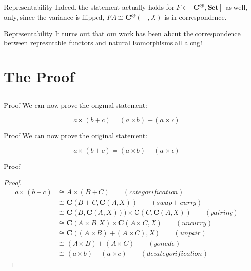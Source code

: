 \documentclass[tikz]{beamer}
\theoremstyle{definition}
\begin{document}
\begin{frame}{Representability}
    Indeed, the statement actually holds for $F \in [\mathbf{C}^{op}, \mathbf{Set}]$ as well, only, since the variance is flipped, $FA \cong \mathbf{C}^{op}(-, X)$ is in correspondence.
\end{frame}{}

\begin{frame}{Representability}
    It turns out that our work has been about the correspondence between represntable functors and natural isomorphisms all along!
\end{frame}{}


\section{The Proof}
\subsection{}
    
\begin{frame}{Proof}
    We can now prove the original statement: 
    
    \begin{block}{}
        \begin{equation*}
            a \times (b + c) = (a \times b) + (a \times c)
        \end{equation*}{}
    \end{block}{}
\end{frame}{}

\begin{frame}{Proof}
    We can now prove the original statement: 
    
    \begin{block}{}
        \begin{equation*}
            a \times (b + c) = (a \times b) + (a \times c)
        \end{equation*}{}
    \end{block}{}
\end{frame}{}

\begin{frame}{Proof}
 \begin{proof}{}
 \begin{align*}
     a \times (b + c) &\cong A \times (B + C) \qquad (categorification) \\
                      &\cong \mathbf{C}(B + C, \mathbf{C}(A, X)) \qquad (swap + curry)\\
                      &\cong \mathbf{C}(B, \mathbf{C}(A, X)))   \times \mathbf{C}(C, \mathbf{C}(A, X)) \qquad (pairing) \\
                      &\cong \mathbf{C}(A\times B, X) \times \mathbf{C}(A\times C, X) \qquad (uncurry) \\
                      &\cong \mathbf{C}((A \times B) + (A \times C), X) \qquad (unpair)\\
                      &\cong (A \times B) + (A \times C) \qquad (yoneda) \\
                      &\cong (a \times b) + (a \times c) \qquad (decategorification)
 \end{align*}{}
 \end{proof}
\end{frame}{}
\end{document}
